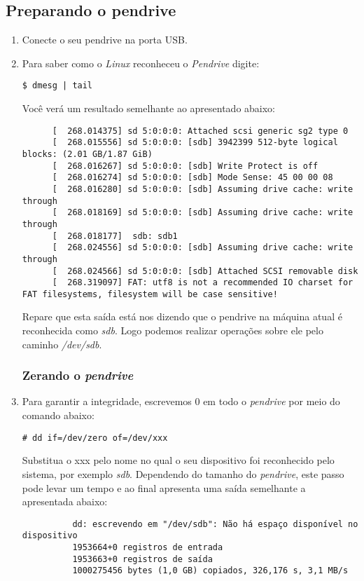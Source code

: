 \documentclass[a4paper,10pt]{article}
\begin{document}
  \subsection{Preparando o pendrive}
    \begin{enumerate}
      \item Conecte o seu pendrive na porta USB.
      \item Para saber como o \emph{Linux} reconheceu o \emph{Pendrive} digite:
	\begin{lstlisting}[frame=single]
	  $ dmesg | tail
	\end{lstlisting}
      Você verá um resultado semelhante ao apresentado abaixo:

	\begin{lstlisting}
      [  268.014375] sd 5:0:0:0: Attached scsi generic sg2 type 0
      [  268.015556] sd 5:0:0:0: [sdb] 3942399 512-byte logical blocks: (2.01 GB/1.87 GiB)
      [  268.016267] sd 5:0:0:0: [sdb] Write Protect is off
      [  268.016274] sd 5:0:0:0: [sdb] Mode Sense: 45 00 00 08
      [  268.016280] sd 5:0:0:0: [sdb] Assuming drive cache: write through
      [  268.018169] sd 5:0:0:0: [sdb] Assuming drive cache: write through
      [  268.018177]  sdb: sdb1
      [  268.024556] sd 5:0:0:0: [sdb] Assuming drive cache: write through
      [  268.024566] sd 5:0:0:0: [sdb] Attached SCSI removable disk
      [  268.319097] FAT: utf8 is not a recommended IO charset for FAT filesystems, filesystem will be case sensitive!
	\end{lstlisting}
      Repare que esta saída está nos dizendo que o pendrive na máquina atual é reconhecida como \emph{sdb}. 
      Logo podemos realizar operações sobre ele pelo caminho \emph{/dev/sdb}.

      \subsubsection{Zerando o \emph{pendrive}}
	\item Para garantir a integridade, escrevemos 0 em todo o \emph{pendrive} por meio do comando abaixo:
	    \begin{lstlisting}[frame=single]
	      # dd if=/dev/zero of=/dev/xxx
	    \end{lstlisting}
	    Substitua o xxx pelo nome no qual o seu dispositivo foi reconhecido pelo sistema, por exemplo 
	    \emph{sdb}. Dependendo do tamanho do \emph{pendrive}, este passo pode levar um tempo e ao final 
	      apresenta uma saída semelhante a apresentada abaixo:
	    \begin{verbatim}
	      dd: escrevendo em "/dev/sdb": Não há espaço disponível no dispositivo
	      1953664+0 registros de entrada
	      1953663+0 registros de saída
	      1000275456 bytes (1,0 GB) copiados, 326,176 s, 3,1 MB/s
	    \end{verbatim}


\end{enumerate}
\end{document}
